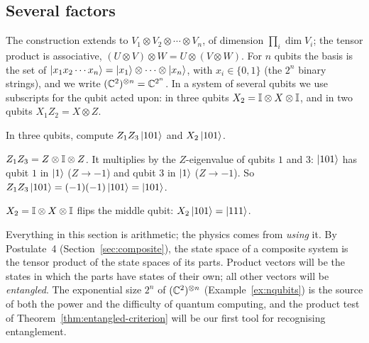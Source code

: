 \subsection{Several factors}

The construction extends to $V_1\otimes V_2\otimes\cdots\otimes V_n$, of dimension $\prod_i\dim V_i$; the tensor product is associative, $(U\otimes V)\otimes W=U\otimes(V\otimes W)$. For $n$ qubits the basis is the set of $\left|x_1x_2\cdots x_n\right\rangle=\left|x_1\right\rangle\otimes\cdots\otimes\left|x_n\right\rangle$, with $x_i\in\{0,1\}$ (the $2^n$ binary strings), and we write $(\mathbb{C}^2)^{\otimes n}=\mathbb{C}^{2^n}$. In a system of several qubits we use subscripts for the qubit acted upon: in three qubits $X_2=\mathbb{I}\otimes X\otimes\mathbb{I}$, and in two qubits $X_1Z_2=X\otimes Z$.

\begin{example}\label{ex:three-qubits}
  In three qubits, compute $Z_1Z_3\left|101\right\rangle$ and $X_2\left|101\right\rangle$.
\end{example}
\begin{solution}
  \begin{steps}
    \item \emph{$Z_1Z_3=Z\otimes\mathbb{I}\otimes Z$.} It multiplies by the $Z$-eigenvalue of qubits $1$ and $3$: $\left|101\right\rangle$ has qubit $1$ in $\left|1\right\rangle$ ($Z\to-1$) and qubit $3$ in $\left|1\right\rangle$ ($Z\to-1$). So $Z_1Z_3\left|101\right\rangle=(-1)(-1)\left|101\right\rangle=\left|101\right\rangle$.
    \item \emph{$X_2=\mathbb{I}\otimes X\otimes\mathbb{I}$} flips the middle qubit: $X_2\left|101\right\rangle=\left|111\right\rangle$.
  \end{steps}
\end{solution}

\begin{lookahead}
  Everything in this section is arithmetic; the physics comes from \emph{using} it. By Postulate~4 (Section~\ref{sec:composite}), the state space of a composite system is the tensor product of the state spaces of its parts. Product vectors will be the states in which the parts have states of their own; all other vectors will be \emph{entangled}. The exponential size $2^n$ of $(\mathbb{C}^2)^{\otimes n}$ (Example~\ref{ex:nqubits}) is the source of both the power and the difficulty of quantum computing, and the product test of Theorem~\ref{thm:entangled-criterion} will be our first tool for recognising entanglement.
\end{lookahead}

